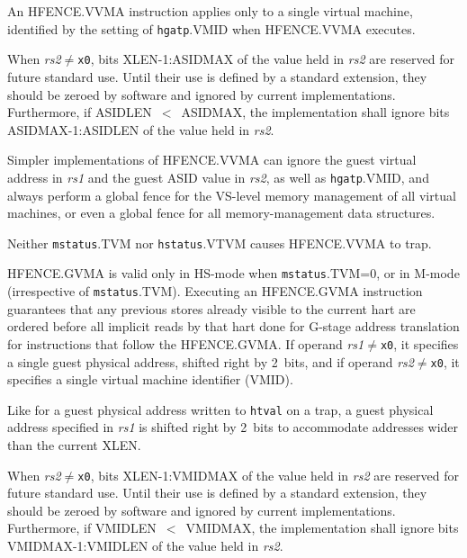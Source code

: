 \begin{commentary}
An HFENCE.VVMA instruction applies only to a single virtual machine, identified
by the setting of {\tt hgatp}.VMID when HFENCE.VVMA executes.
\end{commentary}

When {\em rs2}$\neq${\tt x0}, bits XLEN-1:ASIDMAX of the value held in {\em
rs2} are reserved for future standard use.  Until their use is defined by a
standard extension, they should be zeroed by software and ignored
by current implementations.
Furthermore, if ASIDLEN~$<$~ASIDMAX, the implementation shall ignore bits
ASIDMAX-1:ASIDLEN of the value held in {\em rs2}.

\begin{commentary}
Simpler implementations of HFENCE.VVMA can ignore the guest virtual address in
{\em rs1} and the guest ASID value in {\em rs2}, as well as {\tt hgatp}.VMID,
and always perform a global fence for the VS-level memory management of all
virtual machines, or even a global fence for all memory-management data
structures.
\end{commentary}

Neither {\tt mstatus}.TVM nor {\tt hstatus}.VTVM causes HFENCE.VVMA to
trap.

HFENCE.GVMA is valid only in HS-mode when {\tt mstatus}.TVM=0, or in
M-mode (irrespective of {\tt mstatus}.TVM).
Executing an HFENCE.GVMA instruction guarantees that any previous stores
already visible to the current hart are ordered before all implicit
reads by that hart done for G-stage address translation for instructions
that follow the HFENCE.GVMA.
If operand {\em rs1}$\neq${\tt x0}, it specifies a single guest physical
address, shifted right by 2~bits, and if operand {\em rs2}$\neq${\tt x0}, it
specifies a single virtual machine identifier (VMID).

\begin{commentary}
Like for a guest physical address written to {\tt htval} on a
trap, a guest physical address specified in {\em rs1} is shifted
right by 2~bits to accommodate addresses wider than the current XLEN.
\end{commentary}

When {\em rs2}$\neq${\tt x0}, bits XLEN-1:VMIDMAX of the value held in {\em
rs2} are reserved for future standard use.  Until their use is defined by a
standard extension, they should be zeroed by software and ignored
by current implementations.
Furthermore, if VMIDLEN~$<$~VMIDMAX, the implementation shall ignore bits
VMIDMAX-1:VMIDLEN of the value held in {\em rs2}.

